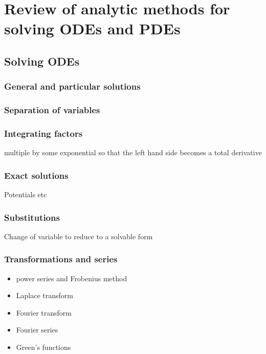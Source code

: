\chapter{Review of analytic methods for solving ODEs and PDEs}

\section{Solving ODEs}

\subsection{General and particular solutions}

\subsection{Separation of variables}

\subsection{Integrating factors}
multiple by some exponential so that the left hand side becomes a total derivative


\subsection{Exact solutions}

Potentials etc

\subsection{Substitutions}

Change of variable to reduce to a solvable form

\subsection{Transformations and series}

\begin{itemize}
    \item power series and Frobenius method
    \item Laplace transform
    \item Fourier transform
    \item Fourier series
    \item Green's functions
\end{itemize}

